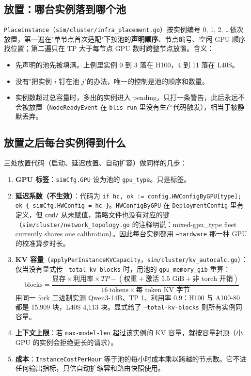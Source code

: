 \documentclass[11pt,a4paper,fontset=windows]{ctexart}
\begin{document}
\subsection{放置：哪台实例落到哪个池}

\texttt{PlaceInstance}（\texttt{sim/cluster/infra\_placement.go}）按实例编号 0, 1, 2, \ldots 依次放置，第一遍在"单节点首次适配"下按池的\textbf{声明顺序}、节点编号、空闲 GPU 顺序找位置；第二遍只在 TP 大于每节点 GPU 数时跨整节点放置。含义：
\begin{itemize}
\item 先声明的池先被填满。上例里实例 0 到 3 落在 H100，4 到 11 落在 L40S。
\item 没有"把实例 $i$ 钉在池 $j$"的办法，唯一的控制是池的顺序和数量。
\item 实例数超过总容量时，多出的实例进入 pending，只打一条警告，此后永远不会被放置（\texttt{NodeReadyEvent} 在 \texttt{blis run} 里没有生产代码触发），相当于被静默丢弃。
\end{itemize}

\subsection{放置之后每台实例得到什么}

三处放置代码（启动、延迟放置、自动扩容）做同样的几步：
\begin{enumerate}
\item \textbf{GPU 标签}：\texttt{simCfg.GPU} 设为池的 \texttt{gpu\_type}。只是标签。
\item \textbf{延迟系数（不生效）}：代码为 \texttt{if hc, ok := config.HWConfigByGPU[type]; ok \{ simCfg.HWConfig = hc \}}。\texttt{HWConfigByGPU} 在 \texttt{DeploymentConfig} 里有定义，但 \texttt{cmd/} 从未赋值，策略文件也没有对应的键（\texttt{sim/cluster/network\_topology.go} 的注释明说：mixed-gpu\_type fleet currently shares one calibration）。因此每台实例都用 \texttt{--hardware} 那一种 GPU 的校准算步时长。
\item \textbf{KV 容量}（\texttt{applyPerInstanceKVCapacity}，\texttt{sim/cluster/kv\_autocalc.go}）：仅当没有显式传 \texttt{--total-kv-blocks} 时，用池的 \texttt{gpu\_memory\_gib} 重算：
\[\text{blocks} = \frac{\text{显存}\times\text{利用率}\times TP - (\text{权重} + \text{激活 5.5 GiB} + \text{非 torch 开销})}{16\ \text{tokens}\times\text{每 token KV 字节}}\]
用同一 fork 二进制实测 Qwen3-14B、TP 1、利用率 0.9：H100 与 A100-80 都是 15,909 块，L40S 4,113 块。显式给了 \texttt{--total-kv-blocks} 则所有实例同容量。
\item \textbf{上下文上限}：若 \texttt{max-model-len} 超过该实例的 KV 容量，就按容量封顶（小 GPU 的实例会拒绝更长的请求）。
\item \textbf{成本}：\texttt{InstanceCostPerHour} 等于池的每小时成本乘以跨越的节点数。它不进任何输出指标，只供自动扩缩容和路由快照使用。
\end{enumerate}
\end{document}
